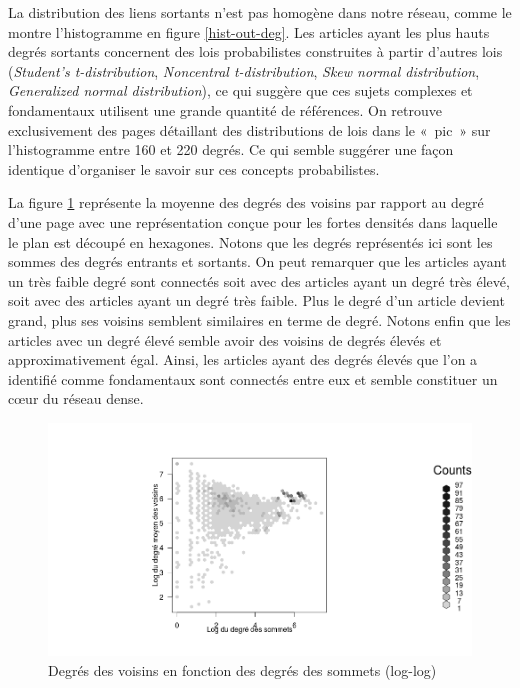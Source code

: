 \documentclass[a4paper]{article}
\begin{document}
La distribution des liens sortants n'est pas homogène dans notre réseau, comme le montre l'histogramme en figure \ref{hist-out-deg}. Les articles ayant les plus hauts degrés sortants concernent des lois probabilistes construites à partir d'autres lois (\textit{Student's t-distribution}, \textit{Noncentral t-distribution}, \textit{Skew normal distribution}, \textit{Generalized normal distribution}), ce qui suggère que ces sujets complexes et fondamentaux utilisent une grande quantité de références. On retrouve exclusivement des pages détaillant des distributions de lois dans le «~pic~» sur l'histogramme entre 160 et 220 degrés. Ce qui semble suggérer une façon identique d'organiser le savoir sur ces concepts probabilistes.

La figure \ref{hex-deg-nei} représente la moyenne des degrés des voisins par rapport au degré d'une page avec une représentation conçue pour les fortes densités dans laquelle le plan est découpé en hexagones. Notons que les degrés représentés ici sont les sommes des degrés entrants et sortants. On peut remarquer que les articles ayant un très faible degré sont connectés soit avec des articles ayant un degré très élevé, soit avec des articles ayant un degré très faible. Plus le degré d'un article devient grand, plus ses voisins semblent similaires en terme de degré. Notons enfin que les articles avec un degré élevé semble avoir des voisins de degrés élevés et approximativement égal. Ainsi, les articles ayant des degrés élevés que l'on a identifié comme fondamentaux sont connectés entre eux et semble constituer un cœur du réseau dense.

\begin{figure}[h!]
   \centering
   \caption{\label{hex-deg-nei} Degrés des voisins en fonction des degrés des sommets (log-log)}
   \includegraphics[scale=0.40]{../images/hex-deg-nei}
\end{figure}
\end{document}
